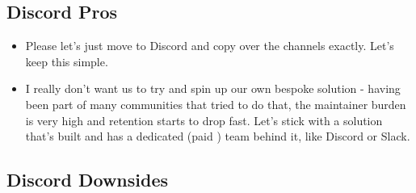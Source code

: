 \documentclass[
]{book}
\providecommand{\tightlist}{%
  \setlength{\itemsep}{0pt}\setlength{\parskip}{0pt}}
\begin{document}
\subsection{Discord Pros}\label{discord-pros}

\begin{itemize}
\tightlist
\item
  Please let's just move to Discord and copy over the channels exactly. Let's keep this simple.
\item
  I really don't want us to try and spin up our own bespoke solution - having been part of many communities that tried to do that, the maintainer burden is very high and retention starts to drop fast. Let's stick with a solution that's built and has a dedicated (paid ) team behind it, like Discord or Slack.
\end{itemize}

\subsection{Discord Downsides}\label{discord-downsides}
\end{document}
